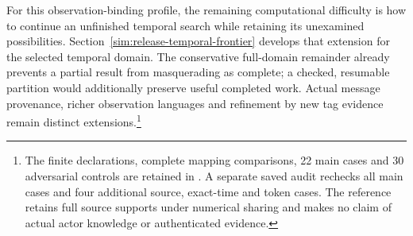 For this observation-binding profile, the remaining computational difficulty is how to continue an unfinished temporal search while retaining its unexamined possibilities. Section~\ref{sim:release-temporal-frontier} develops that extension for the selected temporal domain. The conservative full-domain remainder already prevents a partial result from masquerading as complete; a checked, resumable partition would additionally preserve useful completed work. Actual message provenance, richer observation languages and refinement by new tag evidence remain distinct extensions.\footnote{The finite declarations, complete mapping comparisons, 22 main cases and 30 adversarial controls are retained in . A separate saved audit rechecks all main cases and four additional source, exact-time and token cases. The reference retains full source supports under numerical sharing and makes no claim of actual actor knowledge or authenticated evidence.}
